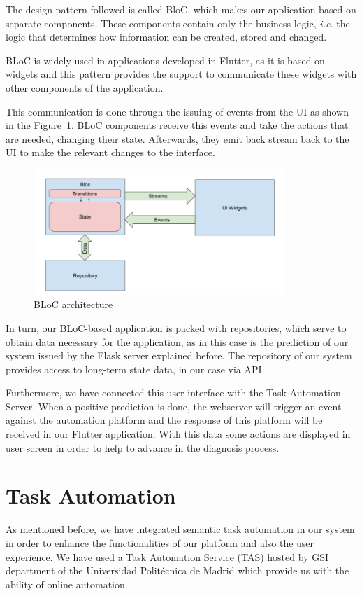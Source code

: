 The design pattern followed is called BloC, which makes our application based on separate components. These components contain only the business logic, \textit{i.e.} the logic that determines how information can be created, stored and changed.

BLoC is widely used in applications developed in Flutter, as it is based on widgets and this pattern provides the support to communicate these widgets with other components of the application.

This communication is done through the issuing of events from the UI as shown in the Figure~\ref{fig:bloc}. BLoC components receive this events and take the actions that are needed, changing their state. Afterwards, they emit back stream back to the UI to make the relevant changes to the interface. 

\begin{figure}[h]
    \centering
    \includegraphics[width=0.85\textwidth]{img/architecture/bloc.png}
    \caption{BLoC architecture}
    \label{fig:bloc}
\end{figure}

In turn, our BLoC-based application is packed with repositories, which serve to obtain data necessary for the application, as in this case is the prediction of our system issued by the Flask server explained before. The repository of our system provides access to long-term state data, in our case via API.

Furthermore, we have connected this user interface with the Task Automation Server. When a positive prediction is done, the webserver will trigger an event against the automation platform and the response of this platform will be received in our Flutter application. With this data some actions are displayed in user screen in order to help to advance in the diagnosis process.

\section{Task Automation}
\label{sec:taskautomation}
As mentioned before, we have integrated semantic task automation in our system in order to enhance the functionalities of our platform and also the user experience. We have used a Task Automation Service (TAS) hosted by GSI department of the Universidad Politécnica de Madrid which provide us with the ability of online automation.

